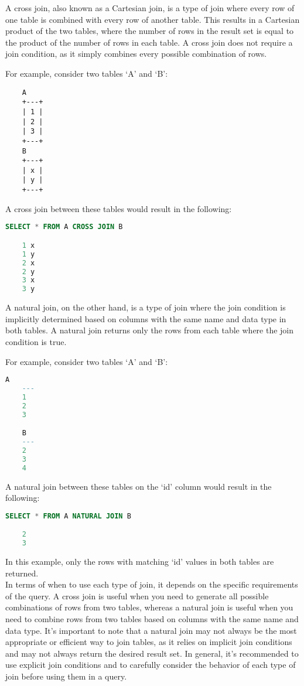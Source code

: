 \documentclass{article}
\begin{document}
A cross join, also known as a Cartesian join, is a type of join where every row of one table is combined with every row of another table. This results in a Cartesian product of the two tables, where the number of rows in the result set is equal to the product of the number of rows in each table. A cross join does not require a join condition, as it simply combines every possible combination of rows.

For example, consider two tables `A' and `B':
\begin{lstlisting}
    A
    +---+
    | 1 |
    | 2 |
    | 3 |
    +---+
    B
    +---+
    | x |
    | y |
    +---+
\end{lstlisting}
A cross join between these tables would result in the following:
\begin{lstlisting}[language=SQL]
    SELECT * FROM A CROSS JOIN B

    1 x
    1 y
    2 x
    2 y
    3 x
    3 y

\end{lstlisting}
A natural join, on the other hand, is a type of join where the join condition is implicitly determined based on columns with the same name and data type in both tables. A natural join returns only the rows from each table where the join condition is true.

For example, consider two tables `A' and `B':
\begin{lstlisting}[language=SQL]
    A
    ---
    1
    2
    3

    B
    ---
    2
    3
    4

\end{lstlisting}
A natural join between these tables on the `id' column would result in the following:
\begin{lstlisting}[language=SQL]
    SELECT * FROM A NATURAL JOIN B

    2
    3

\end{lstlisting}
In this example, only the rows with matching `id' values in both tables are returned.\\

In terms of when to use each type of join, it depends on the specific requirements of the query. A cross join is useful when you need to generate all possible combinations of rows from two tables, whereas a natural join is useful when you need to combine rows from two tables based on columns with the same name and data type. It's important to note that a natural join may not always be the most appropriate or efficient way to join tables, as it relies on implicit join conditions and may not always return the desired result set. In general, it's recommended to use explicit join conditions and to carefully consider the behavior of each type of join before using them in a query.
\end{document}
